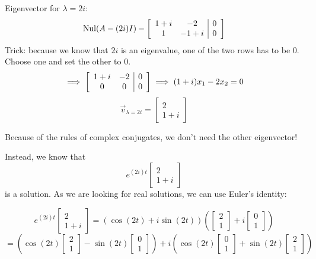 \documentclass[12pt]{article}
\begin{document}
Eigenvector for $\lambda = 2i$:
\[\text{Nul}(A- (2i)I) - \left[\begin{array}{c c | c}
    1 + i & -2 & 0\\
    1 & -1 + i & 0
\end{array}\right]\]
Trick: because we know that $2i$ is an eigenvalue, one of the two rows has to be 0. Choose one and set the other to 0. 
\[\implies \left[\begin{array}{c c | c}
    1 + i & -2 & 0\\
    0 & 0 & 0
\end{array}\right] \implies (1+ i)x_1 -2x_2 = 0\]
\[\vec{v}_{\lambda = 2i} = \begin{bmatrix}
    2\\
    1 + i
\end{bmatrix}\]

Because of the rules of complex conjugates, we don't need the other eigenvector!

Instead, we know that 
\[e^{(2i) t} \begin{bmatrix}
    2\\ 1 +i
\end{bmatrix}\]
is a solution. As we are looking for real solutions, we can use Euler's identity:

\[e^{(2i) t} \begin{bmatrix}
    2\\ 1 +i
\end{bmatrix} = \left(\cos(2t) + i \sin(2t)\right)\left(\begin{bmatrix}
    2\\1
\end{bmatrix} + i \begin{bmatrix}
    0\\1
\end{bmatrix}\right)\]
\[= \left(\cos(2t) \begin{bmatrix}
    2\\1
\end{bmatrix} - \sin(2t) \begin{bmatrix}
    0\\1
\end{bmatrix}\right) + i \left(\cos (2t) \begin{bmatrix}
    0\\1
\end{bmatrix} + \sin(2t) \begin{bmatrix}
    2\\1
\end{bmatrix}\right)\]
\end{document}
